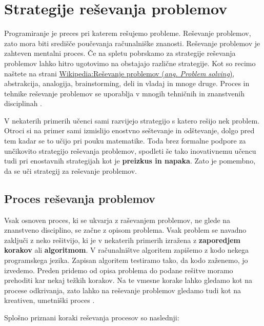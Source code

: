 \section{Strategije reševanja problemov}
\label{sec:strategije_reševanja_problemov}

Programiranje je preces pri katerem rešujemo probleme. Reševanje
problemov, zato mora biti središče poučevanja računalniške
znanosti. Reševanje problemov je zahteven mentalni proces. Če na
spletu pobrskamo za strategije reševanja problemov lahko hitro
ugotovimo na obstajajo različne strategije. Kot so recimo naštete na
strani
\href{https://en.wikipedia.org/wiki/Problem_solving#Problem-solving_strategies}{Wikipedia:Reševanje
  problemov (\emph{ang. Problem solving})}, abstrakcija, analogija,
brainstorming, deli in vladaj in mnoge druge.  Proces in tehnike
reševanje problemov se uporablja v mnogih tehničnih in znanstvenih
disciplinah \cite{guideTCS}.

V nekaterih primerih učenci sami razvijejo strategijo s katero rešijo
nek problem. Otroci si na primer sami izmislijo enostvno seštevanje in
odštevanje, dolgo pred tem kadar se to učijo pri pouku
matematike. Toda brez formalne podpore za unčikovito strategijo
reševanja problemov, spodleti še tako inovativnemu učencu tudi pri
enostavnih strategijah kot je \textbf{preizkus in napaka}. Zato je
pomembno, da se uči strategij za reševanje problemov.

\subsection{Proces reševanja problemov}
\label{sec:proces_reševanja_problemov}

Vsak osnoven proces, ki se ukvarja z raševanjem problemov, ne glede na
znanstveno disciplino, se začne z opisom problema. Vsak problem se
navadno zaključi z neko rešitvijo, ki je v nekaterih primerih izražena
z \textbf{zaporedjem korakov} ali \textbf{algoritmom}. V računalništve
algoritem zapišemo z kodo nekega programskega jezika. Zapisan
algoritem testiramo tako, da kodo zaženemo, jo izvedemo. Preden
pridemo od opisa problema do podane rešitve moramo prehoditi kar nekaj
težkih korakov. Na te vmesne korake lahko gledamo kot na procese
odkrivanja, zato lahko na reševanje problemov gledamo tudi kot na
kreativen, umetniški proces \cite{guideTCS}.

Splošno priznani koraki reševanja procesov so naslednji:

